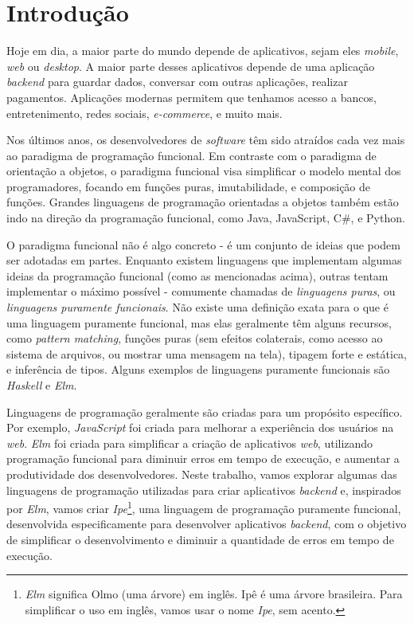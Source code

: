 
\chapter{Introdução}

Hoje em dia, a maior parte do mundo depende de aplicativos, sejam eles \textit{mobile},
\textit{web} ou \textit{desktop}. A maior parte desses aplicativos depende de uma aplicação
\textit{backend} para guardar dados, conversar com outras aplicações, realizar
pagamentos. Aplicações modernas permitem que tenhamos acesso a bancos, entretenimento,
redes sociais, \textit{e-commerce}, e muito mais.

Nos últimos anos, os desenvolvedores de \textit{software} têm sido atraídos cada vez mais
ao paradigma de programação funcional. Em contraste com o paradigma de orientação
a objetos, o paradigma funcional visa simplificar o modelo mental dos programadores,
focando em funções puras, imutabilidade, e composição de funções. Grandes linguagens
de programação orientadas a objetos também estão indo na direção da programação funcional,
como Java, JavaScript, C\#, e Python.

O paradigma funcional não é algo concreto - é um conjunto de ideias que podem ser
adotadas em partes. Enquanto existem linguagens que implementam
algumas ideias da programação funcional (como as mencionadas acima), outras
tentam implementar o máximo possível - comumente chamadas de \textit{linguagens puras},
ou \textit{linguagens puramente funcionais}. Não existe uma definição exata para
o que é uma linguagem puramente funcional, mas elas geralmente têm alguns recursos,
como \textit{pattern matching}, funções puras (sem efeitos colaterais, como acesso
ao sistema de arquivos, ou mostrar uma mensagem na tela), tipagem forte e estática,
e inferência de tipos. Alguns exemplos de linguagens puramente funcionais são
\textit{Haskell} e \textit{Elm}.

Linguagens de programação geralmente são criadas para um propósito específico. Por
exemplo, \textit{JavaScript} foi criada para melhorar a experiência dos usuários
na \textit{web}. \textit{Elm} foi criada para simplificar a criação de aplicativos
\textit{web}, utilizando programação funcional para diminuir erros em tempo de
execução, e aumentar a produtividade dos desenvolvedores. Neste trabalho, vamos
explorar algumas das linguagens de programação utilizadas para criar aplicativos
\textit{backend} e, inspirados por \textit{Elm}, vamos criar
\textit{Ipe}\footnote{\textit{Elm} significa Olmo (uma árvore) em inglês. Ipê é uma árvore brasileira. Para simplificar o uso em inglês, vamos usar o nome \textit{Ipe}, sem acento.},
uma linguagem de programação puramente funcional, desenvolvida especificamente para
desenvolver aplicativos \textit{backend}, com o objetivo de simplificar o desenvolvimento
e diminuir a quantidade de erros em tempo de execução.

